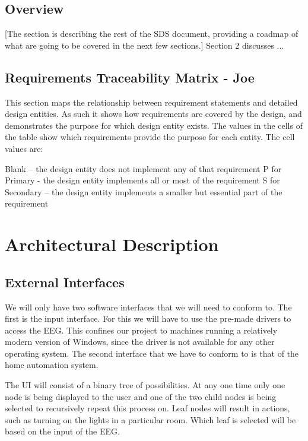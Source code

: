 \documentclass{article}
\begin{document}
\subsection{Overview}


[The section is describing the rest of the SDS document, providing a roadmap of what are going to be covered in the next few sections.]
Section 2 discusses ...

\subsection{Requirements Traceability Matrix - Joe}
This section maps the relationship between requirement statements and detailed design entities.  As such it shows how requirements are covered by the design, and demonstrates the purpose for which design entity exists.
The values in the cells of the table show which requirements provide the purpose for each entity. The cell values are:

Blank – the design entity does not implement any of that requirement
P for Primary - the design entity implements all or most of the requirement
S for Secondary – the design entity implements a smaller but essential part of the requirement

\newpage

\section{Architectural Description}

\subsection{External Interfaces}

We will only have two software interfaces that we will need to conform to. The
first is the input interface. For this we will have to use the pre-made
drivers to access the EEG. This confines our project to machines running a
relatively modern version of Windows, since the driver is not available for
any other operating system. The second interface that we have to conform to is
that of the home automation system.

The UI will consist of a binary tree of possibilities. At any one time only
one node is being displayed to the user and one of the two child nodes is
being selected to recursively repeat this process on. Leaf nodes will result
in actions, such as turning on the lights in a particular room. Which leaf is
selected will be based on the input of the EEG.
\end{document}
